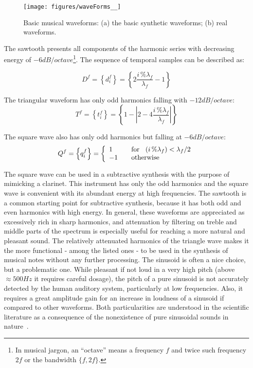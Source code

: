 \begin{figure}
    \centering
        \texttt{[image: figures/waveForms\_\_]}
    \caption{Basic musical waveforms: (a) the basic synthetic  waveforms; (b) real waveforms.}
        \label{fig:formasDeOnda}
\end{figure}

The sawtooth presents all components of the harmonic series with decreasing energy of $-6dB/octave$\footnote{In 
musical jargon, an ``octave'' means a frequency $f$ and twice such frequency $2f$ or the bandwidth $\{f,2f\}$.}. The sequence of temporal samples can be described as:

\begin{equation}\label{sawTooth}
     D^f=\left\{ d^f_i \right\}=\left\{ 2\frac{i\,\%\lambda_f}{\lambda_f} -1 \right\}
\end{equation}

The triangular waveform has only odd harmonics falling with $-12dB/octave$:
\begin{equation}\label{triangular}
     T^f=\left\{ t^f_i \right\}=\left\{1- \left| 2 - 4\frac{i\,\%\lambda_f}{\lambda_f} \right| \right\}
\end{equation}

The square wave also has only odd harmonics but falling at $-6dB/octave$:
\begin{equation}\label{square}
     Q^f=\left\{ q^f_i \right\}= \left\{
         \begin{array}{l l}
              1 & \quad \text{for } \; \; (i\,\%\lambda_f)   <  \lambda_f /2  \\
              -1 & \quad \text{otherwise}\\
         \end{array} \right.
\end{equation}

The square wave can be used in a subtractive synthesis with the purpose of mimicking a clarinet. This instrument has only the odd harmonics and the square wave is convenient with its abundant energy at high frequencies.
The sawtooth is a common starting point for subtractive synthesis, because it has both odd and even harmonics with high energy. In general, these waveforms are appreciated as excessively rich in sharp harmonics, and attenuation by filtering on treble and middle parts of the spectrum is especially useful for reaching a more natural and pleasant sound. 
The relatively attenuated harmonics of the triangle wave makes it the more functional - among the listed ones - to be used in the synthesis of musical notes without any further processing. The sinusoid is often a nice choice, but a problematic one. While pleasant if not loud in a very high pitch (above $\approx 500Hz$ it requires careful dosage), the pitch of a pure sinusoid is not accurately detected by the human auditory system, particularly at low frequencies. Also, it requires a great amplitude gain for an increase in loudness of a sinusoid if compared to other waveforms. Both particularities are understood in the scientific literature as a consequence of the nonexistence of pure sinusoidal sounds in nature~\cite{Roederer}.

